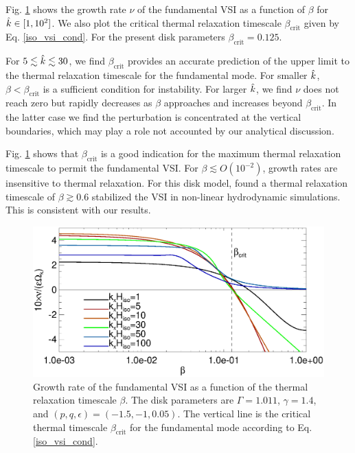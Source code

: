 Fig. \ref{bcrit_compare1} shows the growth rate $\nu$ of the
fundamental VSI as a function of $\beta$ for $\hat{k}\in[1,10^2]$. We
also plot the critical thermal relaxation timescale
$\beta_\mathrm{crit}$ given by Eq. \ref{iso_vsi_cond}. For the present
disk parameters $\beta_\mathrm{crit}=0.125$.   

For $5\lesssim\hat{k}\lesssim30$, we find $\beta_\mathrm{crit}$ provides an
accurate prediction of the upper limit to the thermal relaxation 
timescale for  the fundamental mode. For smaller $\hat{k}$,
$\beta<\beta_\mathrm{crit}$ is a sufficient condition for
instability. For larger $\hat{k}$, we find $\nu$ does not reach zero but
rapidly decreases as $\beta$ approaches and increases beyond
$\beta_\mathrm{crit}$. In the latter case we find the perturbation is
concentrated at the vertical boundaries, which may play a role not
accounted by our analytical discussion. 

Fig. \ref{bcrit_compare1} shows that 
$\beta_\mathrm{crit}$ is a good indication for the maximum
thermal relaxation timescale to permit the fundamental VSI. For
$\beta\lesssim O(10^{-2})$, growth rates are insensitive to thermal
relaxation. For this disk model, \citeauthor{nelson13}
found a thermal relaxation timescale of $\beta\gtrsim 0.6$ stabilized
the VSI in non-linear hydrodynamic simulations. This is consistent
with our results.   


 \begin{figure}
   \includegraphics[width=\linewidth]{figures/bcrit_compare} 
   \caption{Growth rate of the fundamental VSI as
     a function of the thermal relaxation timescale $\beta$. The disk
     parameters are $\Gamma=1.011$, $\gamma=1.4$, and 
     $(p,q,\epsilon)=(-1.5,-1,0.05)$. The vertical line
     is the critical thermal timescale $\beta_\mathrm{crit}$ for the
     fundamental mode according to Eq. \ref{iso_vsi_cond}. 
     \label{bcrit_compare1}}   
 \end{figure} 

